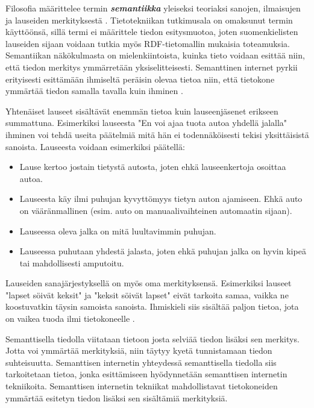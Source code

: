 \documentclass[finnish, 12pt, a4paper, elec, utf8, pdfa, online]{aaltothesis}
\begin{document}
Filosofia määrittelee termin \textbf{\textit{semantiikka}} yleiseksi teoriaksi sanojen, ilmaisujen ja lauseiden merkityksestä \cite{semantics_phi}. Tietotekniikan tutkimusala on omaksunut termin käyttöönsä, sillä termi ei määrittele tiedon esitysmuotoa, joten suomenkielisten lauseiden sijaan voidaan tutkia myös RDF-tietomallin mukaisia toteamuksia. Semantiikan näkökulmasta on mielenkiintoista, kuinka tieto voidaan esittää niin, että tiedon merkitys ymmärretään yksiselitteisesti. Semanttinen internet pyrkii erityisesti esittämään ihmiseltä peräisin olevaa tietoa niin, että tietokone ymmärtää tiedon samalla tavalla kuin ihminen \cite{Berners_visio}.

Yhtenäiset lauseet sisältävät enemmän tietoa kuin lauseenjäsenet erikseen summattuna. Esimerkiksi lauseesta "En voi ajaa tuota autoa yhdellä jalalla" ihminen voi tehdä useita päätelmiä mitä hän ei todennäköisesti tekisi yksittäisistä sanoista. Lauseesta voidaan esimerkiksi päätellä:
\begin{itemize}
  \item  Lause kertoo jostain tietystä autosta, joten ehkä lauseenkertoja osoittaa autoa.
  \item  Lauseesta käy ilmi puhujan kyvyttömyys tietyn auton ajamiseen. Ehkä auto on vääränmallinen (esim. auto on manuaalivaihteinen automaatin sijaan).
  \item  Lauseessa oleva jalka on mitä luultavimmin puhujan.
  \item  Lauseessa puhutaan yhdestä jalasta, joten ehkä puhujan jalka on hyvin kipeä tai mahdollisesti amputoitu.
\end{itemize}
Lauseiden sanajärjestyksellä on myös oma merkityksensä. Esimerkiksi lauseet "lapset söivät keksit" ja "keksit söivät lapset" eivät tarkoita samaa, vaikka ne koostuvatkin täysin samoista sanoista. Ihmiskieli siis sisältää paljon tietoa, jota on vaikea tuoda ilmi tietokoneelle \cite{semantics}.

Semanttisella tiedolla viitataan tietoon josta selviää tiedon lisäksi sen merkitys. Jotta voi ymmärtää merkityksiä, niin täytyy kyetä tunnistamaan tiedon suhteisuutta. Semanttisen internetin yhteydessä semanttisella tiedolla siis tarkoitetaan tietoa, jonka esittämiseen hyödynnetään semanttisen internetin tekniikoita. Semanttisen internetin tekniikat mahdollistavat tietokoneiden ymmärtää esitetyn tiedon lisäksi sen sisältämiä merkityksiä.

\end{document}
